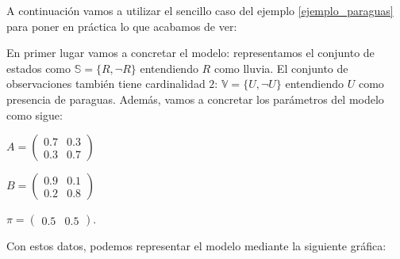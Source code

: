 A continuación vamos a utilizar el sencillo caso del ejemplo \ref{ejemplo_paraguas} para poner en práctica lo que acabamos de ver:
\begin{exampleth} \label{ejemplo_paraguasSol1}
En primer lugar vamos a concretar el modelo: representamos el conjunto de estados como $\mathbb{S}=\{R,\neg R\}$ entendiendo $R$ como lluvia. El conjunto de observaciones también tiene cardinalidad $2$: $\mathbb{V}=\{U,\neg U\}$ entendiendo $U$ como presencia de paraguas. Además, vamos a concretar los parámetros del modelo como sigue:
\begin{center}
    $A=\begin{pmatrix}
    0.7 & 0.3\\
    0.3 & 0.7
    \end{pmatrix}$
\end{center}
\begin{center}
    $B=\begin{pmatrix}
    0.9 & 0.1 \\
    0.2 & 0.8
    \end{pmatrix}$
\end{center}
\begin{center}
    $\pi=\begin{pmatrix}
    0.5 & 0.5
    \end{pmatrix}$.
\end{center}
Con estos datos, podemos representar el modelo mediante la siguiente gráfica:

\begin{figure}[H]
\centering
\captionsetup{justification=centering}
\end{figure}
\end{exampleth}
